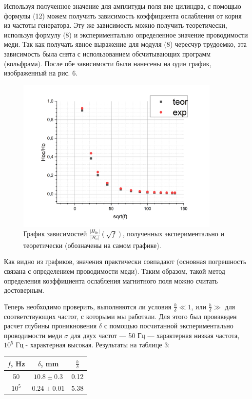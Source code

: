 \documentclass[a4paper, 14pt]{extarticle}%
\newcommand\ECaption[1]{%
     \captionsetup{font=footnotesize}%
     \caption{#1}}
\begin{document}
Используя полученное значение для амплитуды поля вне цилиндра, с помощью формулы (12) можем получить зависимость коэффициента ослабления от корня из частоты генератора. Эту же зависимость можно получить теоретически, используя формулу (8) и экспериментально определенное значение проводимости меди. Так как получать явное выражение для модуля (8) чересчур трудоемко, эта зависимость была снята с использованием обсчитывающих программ (вольфрама). После обе зависимости были нанесены на один график, изображенный на рис. 6.

\begin{figure}[h!]
\begin{center}
\includegraphics[width=0.9\textwidth]{te}
\end{center}
\ECaption{График зависимостей $\frac{|H_{0c}|}{|H_0|}(\sqrt{f})$, полученных экспериментально и теоретически (обозначены на самом графике). }
\end{figure}

Как видно из графиков, значения практически совпадают (основная погрешность связана с определением проводимости меди). Таким образом, такой метод определения коэффициента ослабления магнитного поля можно считать достоверным. 

Теперь необходимо проверить, выполняются ли условия $\frac{h}{\delta}\ll 1$, или $\frac{h}{\delta}\gg$ для соответствующих частот, с которыми мы работали. Для этого был произведен расчет глубины проникновения $\delta$ с помощью посчитанной экспериментально проводимости меди $\sigma$ для двух частот — 50 Гц — характерная низкая частота, $10^5$ Гц - характерная высокая. Результаты на таблице 3:
\begin{table}[h!]
 \begin{center}
\begin{tabular}{|c|c|c|}
\hline
\rowcolor[HTML]{9698ED} 
$f$, Hz & $\delta$, mm & $\frac{h}{\delta}$  \\ \hline
50      & $10.8\pm0.3$     & 0.12 \\ \hline
\rowcolor[HTML]{9698ED} 
$10^5$  & $0.24 \pm 0.01$     & 5.38 \\ \hline
\end{tabular}
 \end{center}
\end{table}
\end{document}
